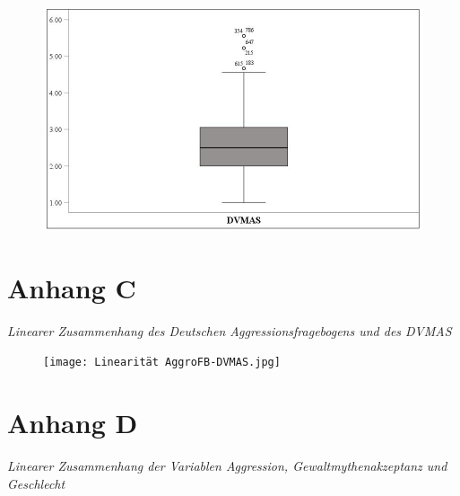 \begin{appendices}
    \begin{figure}[htb!]
        \centering
            \includegraphics[width=\textwidth]{Boxplot DVMAS.jpg}

    \end{figure}
    
    


\chapter*{Anhang C} \label{Linearitat_AggroFB_DVMAS}
\noindent \textit{Linearer Zusammenhang des Deutschen Aggressionsfragebogens und des DVMAS}

\begin{figure}[htb!]
    \centering
        \texttt{[image: Linearität AggroFB-DVMAS.jpg]}
        
\end{figure}
    
    


    \chapter*{Anhang D}            \label{Linearitat_sex_DVMAS}
    \noindent \textit{Linearer Zusammenhang der Variablen Aggression, Gewaltmythenakzeptanz und Geschlecht}


\end{appendices}

